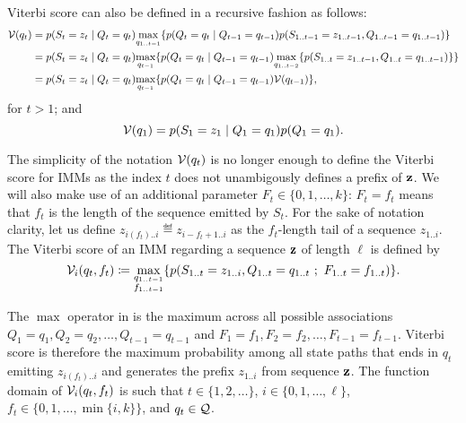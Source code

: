 Viterbi score can also be defined in a recursive fashion as follows:
\begin{equation*}
\begin{split}
  \mathcal{V}(q_t)
  &= p(S_t=z_t \;|\; Q_t=q_t) \underset{q_{1..t-1}}{\max}
    \{ p(Q_t=q_t \;|\; Q_{t-1}=q_{t-1}) p(S_{1..t-1}=z_{1..t-1}, Q_{1..t-1}=q_{1..t-1}) \} \\
  &= p(S_t=z_t \;|\; Q_t=q_t) \underset{q_{t-1}}{\max}
    \{ p(Q_t=q_t \;|\; Q_{t-1}=q_{t-1})
    \underset{q_{1..t-2}}{\max} \{ p(S_{1..t}=z_{1..t-1}, Q_{1..t}=q_{1..t-1}) \} \} \\
  &= p(S_t=z_t \;|\; Q_t=q_t) \underset{q_{t-1}}{\max} \{ p(Q_t=q_t \;|\; Q_{t-1}=q_{t-1})
    \mathcal{V}(q_{t-1}) \},
\end{split}
\end{equation*}
for $t>1$; and
\begin{equation*}
  \mathcal{V}(q_1) = p(S_1=z_1 \;|\; Q_1=q_1) p(Q_1=q_1).
\end{equation*}

The simplicity of the notation $\mathcal{V}(q_t)$ is no longer enough to define the Viterbi score for
IMMs as the index $t$ does not unambigously defines a prefix of $\mathbf{z}$. We will also make use of
an additional parameter $F_t\in \{0, 1, \dots, k\}$: $F_t=f_t$ means that $f_t$ is the length of the
sequence emitted by $S_t$.
For the sake of notation clarity, let us define $z_{i(f_t)..i} \eqdef
z_{i-f_t+1..i}$ as the $f_t$-length tail of a sequence $z_{1..i}$. The Viterbi score of an IMM
regarding a sequence $\mathbf{z}$ of length $\ell$ is defined by
\begin{equation}\label{eq:viterbi}
  \mathcal{V}_{i}(q_t,f_t) \coloneqq
    \underset{\substack{q_{1..t-1}\\f_{1..t-1}}}{\max}
    \{
      p(S_{1..t}=z_{1..i}, Q_{1..t}=q_{1..t} ~;~ F_{1..t}=f_{1..t})
    \}.
\end{equation}

The $\max$ operator in  is the maximum across all possible associations
$Q_1=q_1, Q_2=q_2, \dots, Q_{t-1}=q_{t-1}$ and $F_1=f_1, F_2=f_2, \dots, F_{t-1}=f_{t-1}$. Viterbi
score is therefore the maximum probability among all state paths that ends in $q_t$ emitting
$z_{i(f_t)..i}$ and generates the prefix $z_{1..i}$ from sequence $\mathbf{z}$. The function domain of
$\mathcal{V}_{i}(q_t,f_t)$ is such that $t \in \{1, 2, \dots\}$, $i \in \{0, 1, \dots, \ell\}$, $f_t
\in \{0, 1, \dots, \min\{i, k\}\}$, and $q_t \in \mathcal{Q}$.

